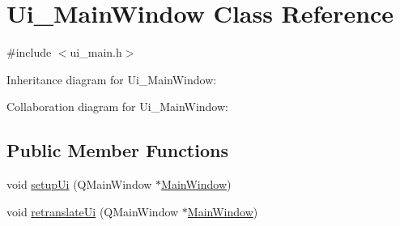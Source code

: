 \hypertarget{class_ui___main_window}{}\section{Ui\+\_\+\+Main\+Window Class Reference}
\label{class_ui___main_window}


{\ttfamily \#include $<$ui\+\_\+main.\+h$>$}



Inheritance diagram for Ui\+\_\+\+Main\+Window\+:


Collaboration diagram for Ui\+\_\+\+Main\+Window\+:
\subsection*{Public Member Functions}
\begin{DoxyCompactItemize}
\item 
void \hyperlink{class_ui___main_window_acf4a0872c4c77d8f43a2ec66ed849b58}{setup\+Ui} (Q\+Main\+Window $\ast$\hyperlink{class_main_window}{Main\+Window})
\item 
void \hyperlink{class_ui___main_window_a097dd160c3534a204904cb374412c618}{retranslate\+Ui} (Q\+Main\+Window $\ast$\hyperlink{class_main_window}{Main\+Window})
\end{DoxyCompactItemize}
